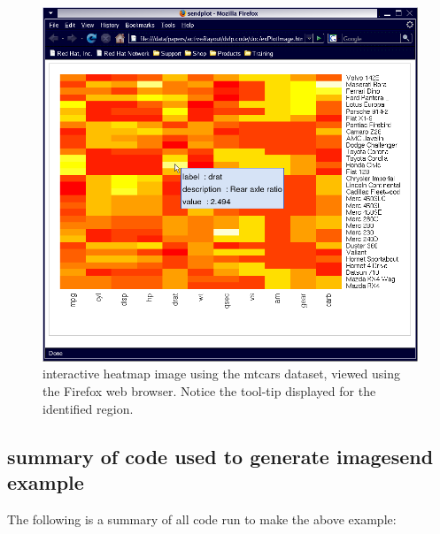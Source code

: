 \documentclass[]{article}
\begin{document}
\begin{center}
\begin{figure}
\includegraphics{iExPlotImage}
\caption{interactive heatmap image using the mtcars dataset, viewed using the Firefox web browser. Notice the tool-tip displayed for the identified region.}
\end{figure}
\end{center}


\subsection{summary of code used to generate imagesend example}

 The following is a summary of all code run to make the above example:
\end{document}
